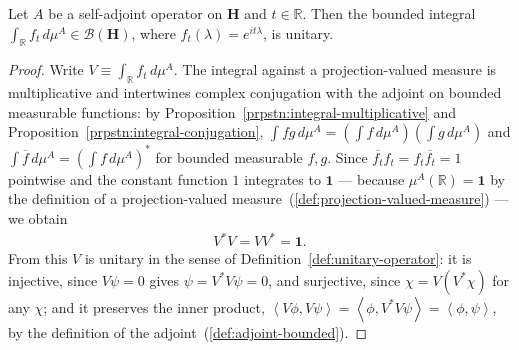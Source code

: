 \begin{lemma}
    \label{lmm:exp-unitary}
    \leanok
    Let $A$ be a self-adjoint operator on $\mathbf{H}$ and $t \in \mathbb{R}$. Then the bounded integral $\int_{\mathbb{R}} f_t \, d\mu^A \in \mathcal{B}(\mathbf{H})$, where $f_t(\lambda) = e^{it\lambda}$, is unitary.
\end{lemma}
\begin{proof}
    \leanok
Write $V \equiv \int_{\mathbb{R}} f_t \, d\mu^A$. The integral against a projection-valued measure is multiplicative and intertwines complex conjugation with the adjoint on bounded measurable functions: by Proposition~\ref{prpstn:integral-multiplicative} and Proposition~\ref{prpstn:integral-conjugation}, $\int fg \, d\mu^A = \left( \int f \, d\mu^A \right)\left( \int g \, d\mu^A \right)$ and $\int \overline{f} \, d\mu^A = \left( \int f \, d\mu^A \right)^*$ for bounded measurable $f,g$. Since $\overline{f_t}f_t = f_t\overline{f_t} = 1$ pointwise and the constant function $1$ integrates to $\mathbf{1}$ — because $\mu^A(\mathbb{R}) = \mathbf{1}$ by the definition of a projection-valued measure~(\ref{def:projection-valued-measure}) — we obtain
\begin{align}
    V^*V = VV^* = \mathbf{1}.
\end{align}
From this $V$ is unitary in the sense of Definition~\ref{def:unitary-operator}: it is injective, since $V\psi = 0$ gives $\psi = V^*V\psi = 0$, and surjective, since $\chi = V\left( V^*\chi \right)$ for any $\chi$; and it preserves the inner product, $\left< V\phi, V\psi \right> = \left< \phi, V^*V\psi \right> = \left< \phi, \psi \right>$, by the definition of the adjoint~(\ref{def:adjoint-bounded}).
\end{proof}

